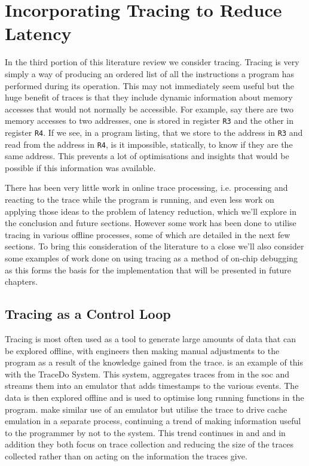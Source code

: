 \section{Incorporating Tracing to Reduce Latency}

\label{sec:tracing}

In the third portion of this literature review we consider tracing. Tracing is very simply a way of producing an ordered list of all the instructions a program has performed during its operation. This may not immediately seem useful but the huge benefit of traces is that they include dynamic information about memory accesses that would not normally be accessible. For example, say there are two memory accesses to two addresses, one is stored in register \texttt{R3} and the other in register \texttt{R4}. If we see, in a program listing, that we store to the address in \texttt{R3} and read from the address in \texttt{R4}, is it impossible, statically, to know if they are the same address. This prevents a lot of optimisations and insights that would be possible if this information was available.


There has been very little work in online trace processing, i.e. processing and reacting to the trace while the program is running, and even less work on applying those ideas to the problem of latency reduction, which we'll explore in the conclusion and future sections. However some work has been done to utilise tracing in various offline processes, some of which are detailed in the next few sections. To bring this consideration of the literature to a close we'll also consider some examples of work done on using tracing as a method of on-chip debugging as this forms the basis for the implementation that will be presented in future chapters.

\subsection{Tracing as a Control Loop}

Tracing is most often used as a tool to generate large amounts of data that can be explored offline, with engineers then making manual adjustments to the program as a result of the knowledge gained from the trace. \citet{huApplicationsOnchipTrace2007} is an example of this with the TraceDo System. This system, aggregates traces from  in the \gls{soc} and streams them into an emulator that adds timestamps to the various events. The data is then explored offline and is used to optimise long running functions in the program. \citet{wangRealTimeCache2013} make similar use of an emulator but utilise the trace to drive cache emulation in a separate process, continuing a trend of making information useful to the programmer by not to the system. This trend continues in \citet{liTracebasedAnalysisMethodology2016} and \citet{mertzPracticalFeasibilitySoftware2019} and in addition they both focus on trace collection and reducing the size of the traces collected rather than on acting on the information the traces give.

